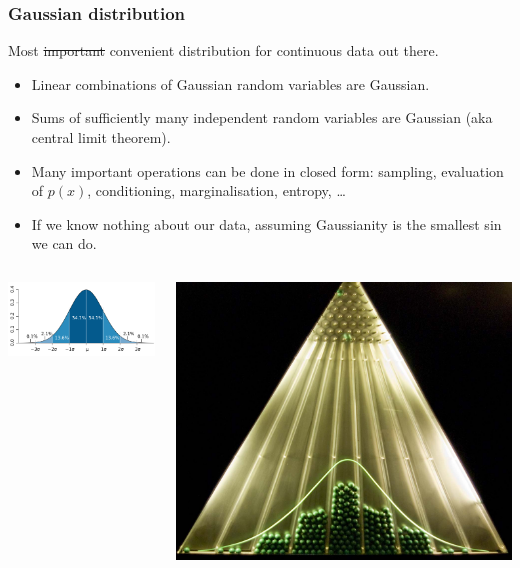 \documentclass[USenglish,pdftex,compress,10pt,svgnamesi,handout]{beamer}
\begin{document}
\begin{frame}
\frametitle{Gaussian distribution}
Most \st{important} convenient distribution for continuous data out there.
\begin{itemize}
    \item Linear combinations of Gaussian random variables are Gaussian.
    \item Sums of sufficiently many independent random variables are Gaussian (aka central limit theorem).
    \item Many important operations can be done in closed form: sampling, evaluation of $p(x)$, conditioning, marginalisation, entropy, \dots
    \item If we know nothing about our data, assuming Gaussianity is the smallest sin we can do.
\end{itemize}


\begin{columns}[t]
\column{5cm}

\includegraphics[width=\linewidth]{pics/normal}

\column{5cm}

\includegraphics[width=\linewidth]{pics/clt}
\end{columns}


\end{frame}
\end{document}
